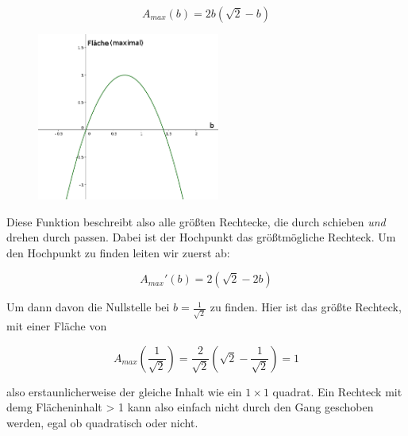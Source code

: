 \documentclass[a4paper,11pt]{article}
\begin{document}
\[ A_{max}(b) = 2b(\sqrt{2}-b) \]

\begin{figure}[H] 
        \centering
        \includegraphics[width=6cm]{img/FA_1.png}
\end{figure}

Diese Funktion beschreibt also alle größten Rechtecke, die durch schieben \textit{und} drehen durch passen. Dabei ist der Hochpunkt das größtmögliche Rechteck. Um den Hochpunkt zu finden leiten wir zuerst ab:

\[ A_{max}'(b) = 2(\sqrt{2}-2b) \]

Um dann davon die Nullstelle bei $b = \frac{1}{\sqrt{2}}$ zu finden. Hier ist das größte Rechteck, mit einer Fläche von

\[ A_{max}(\frac{1}{\sqrt{2}}) = \frac{2}{\sqrt{2}}(\sqrt{2} - \frac{1}{\sqrt{2}}) = 1 \]

also erstaunlicherweise der gleiche Inhalt wie ein $1\times 1$ quadrat. Ein Rechteck mit demg Flächeninhalt > 1 kann also einfach nicht durch den Gang geschoben werden, egal ob quadratisch oder nicht.
\end{document}
